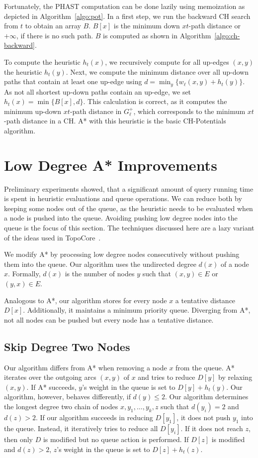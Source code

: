 \documentclass[a4paper,USenglish,cleveref, autoref, thm-restate]{lipics-v2019}
\begin{document}
Fortunately, the PHAST computation can be done lazily using memoization as depicted in Algorithm~\ref{algo:pot}.
In a first step, we run the backward CH search from $t$ to obtain an array $B$.
$B[x]$ is the minimum down $xt$-path distance or $+\infty$, if there is no such path.
$B$ is computed as shown in Algorithm~\ref{algo:ch-backward}.

To compute the heuristic $h_t(x)$, we recursively compute for all up-edges $(x,y)$ the heuristic $h_t(y)$.
Next, we compute the minimum distance over all up-down paths that contain at least one up-edge using $d = \min_y\{w_\ell(x,y) + h_t(y)\}$.
As not all shortest up-down paths contain an up-edge, we set $h_t(x) = \min \{ B[x], d \}$.
This calculation is correct, as it computes the minimum up-down $xt$-path distance in $G^+_\ell$, which corresponds to the minimum $xt$-path distance in a CH.
A* with this heuristic is the basic CH-Potentials algorithm.

\section{Low Degree A* Improvements}

\label{sec:low-deg-improvment}

Preliminary experiments showed, that a significant amount of query running time is spent in heuristic evaluations and queue operations.
We can reduce both by keeping some nodes out of the queue, as the heuristic needs to be evaluated when a node is pushed into the queue.
Avoiding pushing low degree nodes into the queue is the focus of this section.
The techniques discussed here are a lazy variant of the ideas used in TopoCore~\cite{DBLP:conf/gis/DibbeltSW15}.

We modify A* by processing low degree nodes consecutively without pushing them into the queue.
Our algorithm uses the undirected degree $d(x)$ of a node $x$.
Formally, $d(x)$ is the number of nodes $y$ such that $(x,y)\in E$ or $(y,x)\in E$.

Analogous to A*, our algorithm stores for every node $x$ a tentative distance $D[x]$.
Additionally, it maintains a minimum priority queue.
Diverging from A*, not all nodes can be pushed but every node has a tentative distance.

\subsection{Skip Degree Two Nodes}

Our algorithm differs from A* when removing a node $x$ from the queue.
A* iterates over the outgoing arcs $(x,y)$ of $x$ and tries to reduce $D[y]$ by relaxing $(x,y)$.
If A* succeeds, $y$'s weight in the queue is set to $D[y]+h_t(y)$.
Our algorithm, however, behaves differently, if $d(y)\le 2$.
Our algorithm determines the longest degree two chain of nodes $x,y_1,\ldots, y_k, z$ such that $d(y_i)=2$ and $d(z) > 2$.
If our algorithm succeeds in reducing $D[y_1]$, it does not push $y_1$ into the queue.
Instead, it iteratively tries to reduce all $D[y_i]$.
If it does not reach $z$, then only $D$ is modified but no queue action is performed.
If $D[z]$ is modified and $d(z)>2$, $z$'s weight in the queue is set to $D[z]+h_t(z)$.
\end{document}
